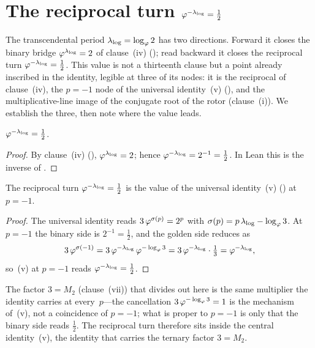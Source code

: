 \section{\texorpdfstring{The reciprocal turn $\varphi^{-\lambda_{\log}}=\tfrac12$}{The reciprocal turn}}
\label{sec:spectral}

The transcendental period $\lambda_{\log}=\log_{\varphi}2$ has two
directions.  Forward it closes the binary bridge
$\varphi^{\lambda_{\log}}=2$ of clause~(iv) (); read
backward it closes the reciprocal turn
$\varphi^{-\lambda_{\log}}=\tfrac12$.  This value is not a thirteenth
clause but a point already inscribed in the identity, legible at three
of its nodes: it is the reciprocal of clause~(iv), the $p=-1$ node of
the universal identity~(v) (), and the
multiplicative-line image of the conjugate root of the rotor
(clause~(i)).  We establish the three, then note where the value leads.

\begin{Lemma}\label{lem:inverse-turn}
$\varphi^{-\lambda_{\log}}=\tfrac12$.
\end{Lemma}

\begin{proof}
By clause~(iv) (), $\varphi^{\lambda_{\log}}=2$; hence
$\varphi^{-\lambda_{\log}}=2^{-1}=\tfrac12$.  In Lean this is the inverse
of .
\end{proof}

\begin{Corollary}[The reciprocal turn is the universal identity at $p=-1$]\label{cor:reciprocal-node}
The reciprocal turn $\varphi^{-\lambda_{\log}}=\tfrac12$ is the value of
the universal identity~(v) () at $p=-1$.
\end{Corollary}

\begin{proof}
The universal identity reads $3\,\varphi^{\sigma(p)}=2^{p}$ with
$\sigma(p)=p\,\lambda_{\log}-\log_{\varphi}3$.  At $p=-1$ the binary side
is $2^{-1}=\tfrac12$, and the golden side reduces as
\[
  3\,\varphi^{\sigma(-1)}
    =3\,\varphi^{-\lambda_{\log}}\,\varphi^{-\log_{\varphi}3}
    =3\,\varphi^{-\lambda_{\log}}\cdot\tfrac13
    =\varphi^{-\lambda_{\log}},
\]
so~(v) at $p=-1$ reads $\varphi^{-\lambda_{\log}}=\tfrac12$.
\end{proof}

The factor $3=M_{2}$ (clause~(vii)) that divides out here is the same
multiplier the identity carries at every~$p$---the cancellation
$3\,\varphi^{-\log_{\varphi}3}=1$ is the mechanism of~(v), not a
coincidence of $p=-1$; what is proper to $p=-1$ is only that the binary
side reads $\tfrac12$.  The reciprocal turn therefore sits inside the
central identity~(v), the identity that carries the ternary factor
$3=M_{2}$.

